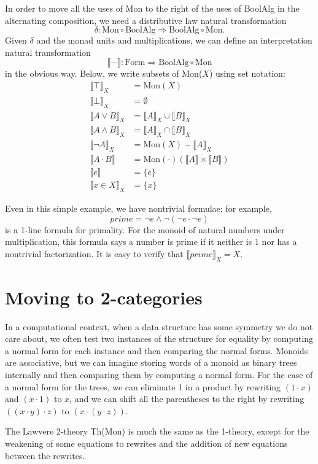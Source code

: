 \documentclass{article}
\newcommand{\interp}[1]{\llbracket #1 \rrbracket}
\newcommand{\maps}{\colon}
\newcommand{\Mon}{\mathrm{Mon}}
\newcommand{\BoolAlg}{\mathrm{BoolAlg}}
\newcommand{\Form}{\mathrm{Form}}
\begin{document}
In order to move all the uses of Mon to the right of the uses of BoolAlg in the alternating composition, we need a distributive law natural transformation
\[ \delta\maps \Mon \circ \BoolAlg \Rightarrow \BoolAlg \circ \Mon. \]
Given $\delta$ and the monad units and multiplications, we can define an interpretation natural transformation
\[ \interp{-}\maps \Form\Rightarrow \BoolAlg \circ \Mon \]
in the obvious way.  Below, we write subsets of Mon($X$) using set notation:
\begin{align*}
  \interp{\top}_X &= \Mon(X)\\
  \interp{\bot}_X &= \emptyset\\
  \interp{{A}\lor{B}}_X &= \interp{A}_X \cup \interp{B}_X\\
  \interp{{A}\land{B}}_X &= \interp{A}_X \cap \interp{B}_X\\
  \interp{\neg A}_X &= \Mon(X) - \interp{A}_X\\
  \interp{{A} \cdot {B}} &= \Mon(\cdot)(\interp{A} \times \interp{B})\\
  \interp{e} &= \{e\}\\
  \interp{x \in X}_X &= \{x\}
\end{align*}

Even in this simple example, we have nontrivial formulae; for example,
\[ prime = \neg e \land \neg(\neg e \cdot \neg e) \]
is a 1-line formula for primality.  For the monoid of natural numbers under multiplication, this formula says a number is prime if it neither is 1 nor has a nontrivial factorization.  It is easy to verify that $\interp{prime}_X = X.$

\section{Moving to 2-categories}

In a computational context, when a data structure has some symmetry we do not care about, we often test two instances of the structure for equality by computing a normal form for each instance and then comparing the normal forms.  Monoids are associative, but we can imagine storing words of a monoid as binary trees internally and then comparing them by computing a normal form.  For the case of a normal form for the trees, we can eliminate 1 in a product by rewriting $(1 \cdot x)$ and $(x \cdot 1)$ to $x$, and we can shift all the parentheses to the right by rewriting $((x \cdot y) \cdot z)$ to $(x \cdot (y \cdot z)).$

The Lawvere 2-theory Th(Mon) is much the same as the 1-theory, except for the weakening of some equations to rewrites and the addition of new equations between the rewrites.
\end{document}
